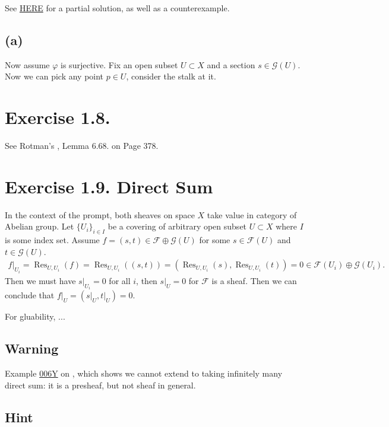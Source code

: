 See \href{https://www.math.arizona.edu/~cais/CourseNotes/AlgGeom04/Hartshorne_Solutions.pdf}{HERE} for a partial solution, as well as a counterexample. 
\subsection{(a)}

Now assume $\varphi$ is surjective. Fix an open subset $U\subset X$ and a section $s\in\mathscr G(U)$. Now we can pick any point $p\in U$, consider the stalk at it.


\section{Exercise 1.8.}

See Rotman's \cite{rotman2009introduction}, Lemma 6.68. on Page 378.

\section{Exercise 1.9. Direct Sum}\label{Hart Ex 1.9.}

In the context of the prompt, both sheaves on space $X$ take value in category of Abelian group. Let $\{U_i\}_{i\in I}$ be a covering of arbitrary open subset $U\subset X$ where $I$ is some index set. Assume $f=(s,t)\in \mathscr F\oplus\mathscr G(U)$ for some $s\in\mathscr F(U)$ and $t\in\mathscr G(U)$. 
\begin{align*}
    f\vert_{U_i}=\operatorname{Res}_{U,U_i}(f)=\operatorname{Res}_{U,U_i}((s,t))=(\operatorname{Res}_{U,U_i}(s),\operatorname{Res}_{U,U_i}(t))=0\in \mathscr F(U_i)\oplus\mathscr G(U_i).
\end{align*}
Then we must have $s\vert_{U_i}=0$ for all $i$, then $s\vert_U=0$ for $\mathscr F$ is a sheaf. Then we can conclude that $f\vert_{U}=(s\vert_U,t\vert_U)=0$.

For gluability, ...

\subsection{Warning}

Example \href{https://stacks.math.columbia.edu/tag/006Y}{006Y} on \cite{stacks-project}, which shows we cannot extend to taking infinitely many direct sum: it is a presheaf, but not sheaf in general.

\subsection{Hint}

